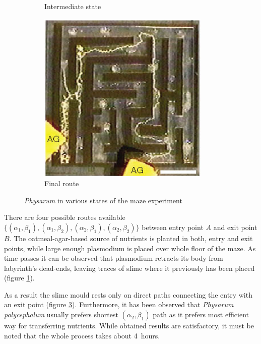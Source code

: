 \documentclass[english,a4paper,twoside]{ppfcmthesis}
\begin{document}
\begin{figure}
\begin{subfigure}{0.45\textwidth}
    \caption{Intermediate state}
    \label{figure:bp_maze_intermediate}
  \end{subfigure}
  \begin{subfigure}{0.45\textwidth}
    \centering
    \includegraphics[width=0.9\textwidth]{background/physarum/maze3.jpg}
    \caption{Final route}
    \label{figure:bp_maze_final}
  \end{subfigure}
  \caption{\textit{Physarum} in various states of the maze experiment \cite{nakagaki2000intelligence}}
\end{figure}

There are four possible routes available $\{(\alpha_1,\beta_1), (\alpha_1,\beta_2), (\alpha_2,\beta_1), (\alpha_2,\beta_2)\}$ between entry point $A$ and exit point $B$. The oatmeal-agar-based source of nutrients is planted in both, entry and exit points, while large enough plasmodium is placed over whole floor of the maze. As time passes it can be observed that plasmodium retracts its body from labyrinth's dead-ends, leaving traces of slime where it previously has been placed (figure \ref{figure:bp_maze_intermediate}). 

As a result the slime mould rests only on direct paths connecting the entry with an exit point (figure \ref{figure:bp_maze_final}). Furthermore, it has been observed that \textit{Physarum polycephalum} usually prefers shortest $(\alpha_2,\beta_1)$ path as it prefers most efficient way for transferring nutrients. While obtained results are satisfactory, it must be noted that the whole process takes about 4~hours. 
\end{document}
